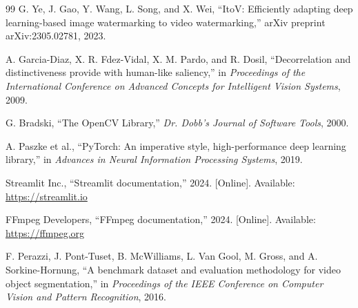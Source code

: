 \documentclass[12pt,oneside]{report}
\begin{document}
\begin{thebibliography}{99}
G. Ye, J. Gao, Y. Wang, L. Song, and X. Wei, ``ItoV: Efficiently adapting deep learning-based image watermarking to video watermarking,'' arXiv preprint arXiv:2305.02781, 2023.

A. Garcia-Diaz, X. R. Fdez-Vidal, X. M. Pardo, and R. Dosil, ``Decorrelation and distinctiveness provide with human-like saliency,'' in \textit{Proceedings of the International Conference on Advanced Concepts for Intelligent Vision Systems}, 2009.

G. Bradski, ``The OpenCV Library,'' \textit{Dr. Dobb's Journal of Software Tools}, 2000.

A. Paszke et al., ``PyTorch: An imperative style, high-performance deep learning library,'' in \textit{Advances in Neural Information Processing Systems}, 2019.

Streamlit Inc., ``Streamlit documentation,'' 2024. [Online]. Available: \url{https://streamlit.io}

FFmpeg Developers, ``FFmpeg documentation,'' 2024. [Online]. Available: \url{https://ffmpeg.org}

F. Perazzi, J. Pont-Tuset, B. McWilliams, L. Van Gool, M. Gross, and A. Sorkine-Hornung, ``A benchmark dataset and evaluation methodology for video object segmentation,'' in \textit{Proceedings of the IEEE Conference on Computer Vision and Pattern Recognition}, 2016.

\end{thebibliography}
\endgroup
\end{document}
